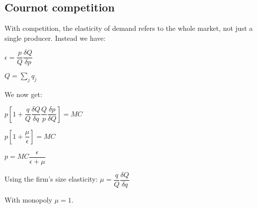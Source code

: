 
\subsection{Cournot competition}

With competition, the elasticity of demand refers to the whole market, not just a single producer. Instead we have:

\(\epsilon = \dfrac{p}{Q}\dfrac{\delta Q}{\delta p}\)

\(Q=\sum_j q_j\)

We now get:

\(p[1+\dfrac{q}{Q}\dfrac{\delta Q}{\delta q}\dfrac{Q}{p}\dfrac{\delta p}{\delta Q}]=MC\)

\(p[1+\dfrac{\mu }{\epsilon }]=MC\)

\(p=MC \dfrac{\epsilon }{\epsilon + \mu }\)

Using the firm's size elasticity: \(\mu = \dfrac{q}{Q}\dfrac{\delta Q}{\delta q}\)

With monopoly \(\mu = 1\).

